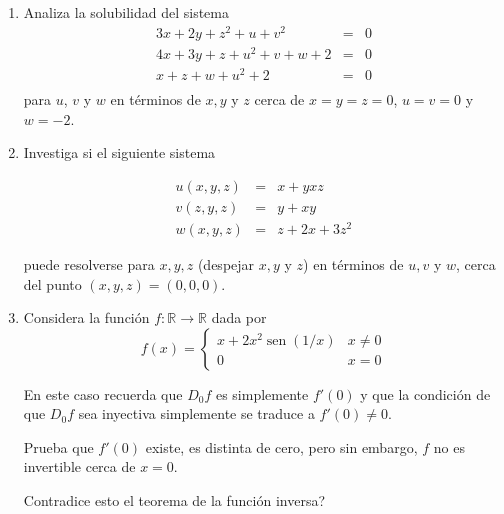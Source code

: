 \documentclass{article}
\theoremstyle{definition}
\newcommand{\sen}{\operatorname{sen}}
\begin{document}
\begin{enumerate}
\begin{enumerate}
          \end{enumerate}


        \item Analiza la solubilidad del sistema
          \begin{eqnarray*}
            3x+2y+z^2+u+v^2&=&0\\
            4x+3y+z+u^2+v+w+2&=&0\\
            x+z+w+u^2+2&=&0\\
          \end{eqnarray*}
          para $u$, $v$ y $w$ en t\'erminos de $x,y$ y $z$ cerca de $x=y=z=0$,
          $u=v=0$ y $w=-2$.

        \item Investiga si el siguiente sistema

          \begin{eqnarray*}
            u(x,y,z)&=&x+yxz \\
            v(z,y,z)&=&y+xy\\
            w(x,y,z)&=&z+2x+3z^2
          \end{eqnarray*}

          puede resolverse para $x,y,z$ (despejar $x,y$ y $z$) en t\'erminos
          de $u,v$ y $w$, cerca del punto $(x,y,z)=(0,0,0)$.
          
        \item Considera la funci\'on $f:\mathbb{R}\to \mathbb{R}$ dada por
          $$
          f(x)=\left\{
            \begin{array}{cc}
              x+2x^2\sen(1/x) & x\ne 0 \\
              0 & x=0
              \end{array}
            \right.
          $$

          En este caso recuerda que $D_0f$ es simplemente $f'(0)$ y que
          la condici\'on de que $D_0f$ sea inyectiva simplemente se traduce
          a $f'(0)\ne0$.

          Prueba que $f'(0)$ existe, es distinta de cero, pero sin embargo,
          $f$ no es invertible cerca de $x=0$.

          \textquestiondown Contradice esto el teorema de la funci\'on inversa?
            
          \end{enumerate}
          

          

	
  
       
\end{document}

